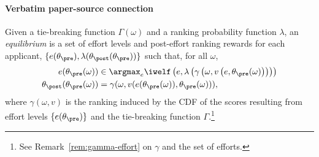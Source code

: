 \documentclass[10pt]{article}
\begin{document}
\paragraph{Verbatim paper-source connection}
\begin{ReviewVerbatim}
\begin{definition} [Equilibrium]\label{def:equi}
{Given a}
tie-breaking function $\Gamma(\omega)$
%
{and}
	a ranking probability function $\lambda$, an \textit{equilibrium} is a set of effort levels and post-effort ranking rewards for each applicant, $\{e(\theta_\pre),  \lambda(\theta_\post(\theta_\pre))\}$ such that, for all
	$\omega$, %
	\begin{align*}
		e(\theta_\pre(\omega)) &\in \argmax_{e} \iwelf\left(e, \lambda\left(\gamma\left(\omega, v\left(e,\theta_\pre(\omega)\right)\right)\right)\right) %
		\\
		\theta_\post(\theta_\pre(\omega)) &= \gamma(\omega, v(e(\theta_\pre(\omega)),\theta_\pre(\omega))),
	\end{align*}
	{where $\gamma(\omega,v)$ is the ranking induced by the CDF of the scores resulting from effort levels $\{e(\theta_\pre)\}$ and the tie-breaking function $\Gamma$.\footnote{See Remark~\ref{rem:gamma-effort} on $\gamma$ and the set of efforts.%
	}
	}
\end{definition}
\end{ReviewVerbatim}
\end{document}
